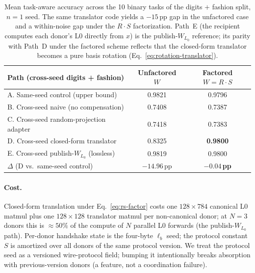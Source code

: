 \documentclass[11pt]{article}
\begin{document}
\begin{table}[t]
\centering
\small
\begin{tabular}{lcc}
\toprule
Path (cross-seed digits + fashion) & Unfactored $W$ & Factored
$W = R \cdot S$ \\
\midrule
A. Same-seed control (upper bound)        & 0.9821 & 0.9796 \\
B. Cross-seed naive (no compensation)     & 0.7408 & 0.7387 \\
C. Cross-seed random-projection adapter   & 0.7418 & 0.7383 \\
D. Cross-seed closed-form translator      & 0.8325 & \textbf{0.9800} \\
E. Cross-seed publish-$W_{L_0}$ (lossless) & 0.9819 & 0.9800 \\
\midrule
$\Delta$ (D vs.\ same-seed control)       & $-14.96$\,pp & $\boldsymbol{-0.04}$\,\textbf{pp} \\
\bottomrule
\end{tabular}
\caption{Mean task-aware accuracy across the 10 binary tasks of the
digits $+$ fashion split, $n = 1$ seed. The same translator code
yields a $-15$\,pp gap in the unfactored case and a within-noise gap
under the $R \cdot S$ factorization. Path~E (the recipient computes
each donor's L0 directly from $x$) is the publish-$W_{L_0}$
reference; its parity with Path~D under the factored scheme reflects
that the closed-form translator becomes a pure basis rotation
(Eq.~\ref{eq:rotation-translator}).}
\label{tab:l0-handshake}
\end{table}

\paragraph{Cost.}
Closed-form translation under Eq.~\ref{eq:rs-factor} costs one
$128 \times 784$ canonical L0 matmul plus one $128 \times 128$
translator matmul per non-canonical donor; at $N = 3$ donors this is
$\approx 50\%$ of the compute of $N$ parallel L0 forwards (the
publish-$W_{L_0}$ path). Per-donor handshake state is the four-byte
$\ell_b$ seed; the protocol constant $S$ is amortized over all donors
of the same protocol version. We treat the protocol seed as a
versioned wire-protocol field; bumping it intentionally breaks
absorption with previous-version donors (a feature, not a coordination
failure).
\end{document}
